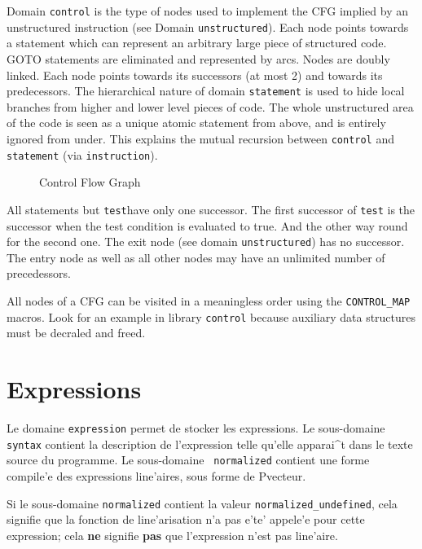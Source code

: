 { 

Domain \verb/control/ is the type of nodes used to implement the CFG
implied by an unstructured instruction (see Domain
\verb/unstructured/). Each node points towards a statement which can
represent an arbitrary large piece of structured code. GOTO statements
are eliminated and represented by arcs. Nodes are doubly linked. Each
node points towards its successors (at most 2) and towards its
predecessors. The hierarchical nature of
domain \verb/statement/ is used to hide local branches from higher and
lower level pieces of code. The whole unstructured area of the code is
seen as a unique atomic statement from above, and is entirely ignored
from under. This explains the mutual recursion between \verb/control/
and \verb/statement/ (via \verb/instruction/).

\begin{figure}
\begin{center}
\mbox{}
\end{center}
\caption{Control Flow Graph}
\label{figure-unstructured}
\end{figure}

All statements but \verb/test/have only one successor. The first
successor of \verb/test/ is the successor when the test condition is
evaluated to true.  And the other way round for the second one. The exit
node (see domain \verb/unstructured/) has no successor. The entry node
as well as all other nodes may have an unlimited number of precedessors.

All nodes of a CFG can be visited in a meaningless order using the
\verb/CONTROL_MAP/ macros. Look for an example in library \verb/control/
because auxiliary data structures must be decraled and freed.

}

\section{Expressions}
\label{expression}

{ 
Le domaine \verb/expression/ permet de stocker les expressions.  Le
sous-domaine {\tt syntax} contient la description de l'expression telle
qu'elle apparai^t dans le texte source du programme. Le sous-domaine {\tt
normalized} contient une forme compile'e des expressions line'aires,
sous forme de Pvecteur.

Si le sous-domaine {\tt normalized} contient la valeur
{\tt normalized\_undefined}, cela signifie que la fonction de line'arisation
n'a pas e'te' appele'e pour cette expression; cela {\bf ne} signifie
{\bf pas}
que l'expression n'est pas line'aire.
}

